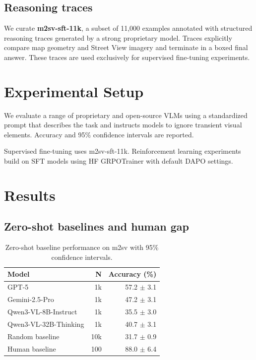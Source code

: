 \documentclass{article}
\begin{document}
\subsection{Reasoning traces}

We curate \textbf{m2sv-sft-11k}, a subset of 11,000 examples annotated with
structured reasoning traces generated by a strong proprietary model. Traces
explicitly compare map geometry and Street View imagery and terminate in a boxed
final answer. These traces are used exclusively for supervised fine-tuning
experiments.

\section{Experimental Setup}

We evaluate a range of proprietary and open-source VLMs using a standardized
prompt that describes the task and instructs models to ignore transient visual
elements. Accuracy and 95\% confidence intervals are reported.

Supervised fine-tuning uses m2sv-sft-11k. Reinforcement learning experiments build
on SFT models using HF GRPOTrainer with default DAPO settings.


\section{Results}

\subsection{Zero-shot baselines and human gap}

\begin{table}[t]
  \centering
  \caption{Zero-shot baseline performance on m2sv with 95\% confidence intervals.}
  \label{tab:m2sv-baselines}
  \begin{tabular}{l r r}
    \toprule
    Model & N & Accuracy (\%) \\
    \midrule
    GPT-5 & 1k & 57.2 $\pm$ 3.1 \\
    Gemini-2.5-Pro & 1k & 47.2 $\pm$ 3.1 \\
    \midrule
    Qwen3-VL-8B-Instruct & 1k & 35.5 $\pm$ 3.0 \\
    Qwen3-VL-32B-Thinking & 1k & 40.7 $\pm$ 3.1 \\
    \midrule
    Random baseline & 10k & 31.7 $\pm$ 0.9 \\
    Human baseline & 100 & 88.0 $\pm$ 6.4 \\
    \bottomrule
  \end{tabular}
\end{table}
\end{document}
